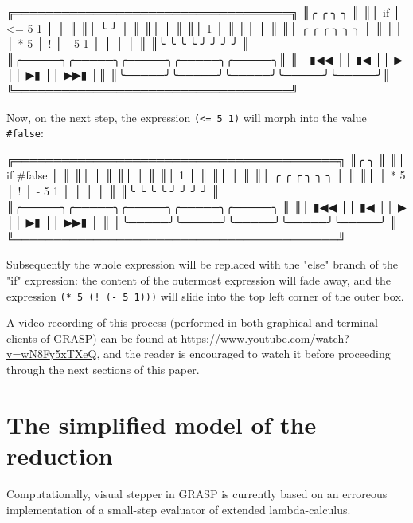 \documentclass[acmsmall]{acmart}
\newenvironment{Snippet}{\Verbatim[samepage=true]}{\endVerbatim}
\begin{document}
\begin{Snippet}
╔═══════════════════════════════════╗
║╭    ╭        ╮                 ╮  ║
║│ if │ <= 5 1 │                 │  ║
║│    ╰        ╯                 │  ║
║│                               │  ║
║│       1                       │  ║
║│                               │  ║
║│       ╭     ╭   ╭       ╮ ╮ ╮ │  ║
║│       │ * 5 │ ! │ - 5 1 │ │ │ │  ║
║╰       ╰     ╰   ╰       ╯ ╯ ╯ ╯  ║
║╭─────╮╭─────╮╭─────╮╭─────╮╭─────╮║
║│ ▮◀◀ ││ ▮◀  ││  ▶  ││  ▶▮ ││ ▶▶▮ │║
║╰─────╯╰─────╯╰─────╯╰─────╯╰─────╯║
╚═══════════════════════════════════╝
\end{Snippet}

Now, on the next step, the expression \texttt{(<= 5 1)} will morph into the
value \texttt{\#false}:

\begin{Snippet}
╔═════════════════════════════════════════╗
║╭                               ╮        ║
║│ if #false                     │        ║
║│                               │        ║
║│                               │        ║
║│       1                       │        ║
║│                               │        ║
║│       ╭     ╭   ╭       ╮ ╮ ╮ │        ║
║│       │ * 5 │ ! │ - 5 1 │ │ │ │        ║
║╰       ╰     ╰   ╰       ╯ ╯ ╯ ╯        ║
║╭─────╮╭─────╮╭─────╮╭─────╮╭─────╮      ║
║│ ▮◀◀ ││ ▮◀  ││  ▶  ││  ▶▮ ││ ▶▶▮ │      ║
║╰─────╯╰─────╯╰─────╯╰─────╯╰─────╯      ║
╚═════════════════════════════════════════╝
\end{Snippet}

Subsequently the whole expression will be replaced with the "else"
branch of the "if" expression: the content of the outermost expression
will fade away, and the expression \texttt{(* 5 (! (- 5 1)))} will slide into
the top left corner of the outer box.

A video recording of this process (performed in both graphical and terminal
clients of GRASP) can be found at \url{https://www.youtube.com/watch?v=wN8Fy5xTXeQ}, 
and the reader is encouraged to watch it before proceeding through the next
sections of this paper.

\section{The simplified model of the reduction}
\label{sec:org159e5f7}

Computationally, visual stepper in GRASP is currently based on an
erroreous implementation of a small-step evaluator of extended
lambda-calculus.
\end{document}
